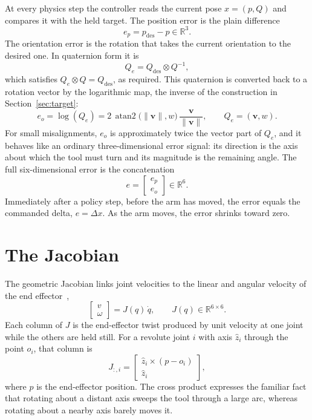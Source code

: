 \documentclass{article}
\newcommand{\R}{\mathbb{R}}
\newcommand{\des}{\mathrm{des}}
\begin{document}
At every physics step the controller reads the current pose $x=(p,Q)$ and compares it with the held target. The position error is the plain difference
\begin{equation}
  e_p = p_\des - p \in\R^3.
\end{equation}
The orientation error is the rotation that takes the current orientation to the desired one. In quaternion form it is
\begin{equation}
  Q_e = Q_\des\otimes Q^{-1},
\end{equation}
which satisfies $Q_e\otimes Q = Q_\des$, as required. This quaternion is converted back to a rotation vector by the logarithmic map, the inverse of the construction in Section~\ref{sec:target}:
\begin{equation}
  e_o = \log(Q_e) = 2\,\operatorname{atan2}\!\big(\lVert\mathbf v\rVert, w\big)\,\frac{\mathbf v}{\lVert\mathbf v\rVert}, \qquad Q_e=(\mathbf v,w).
\end{equation}
For small misalignments, $e_o$ is approximately twice the vector part of $Q_e$, and it behaves like an ordinary three-dimensional error signal: its direction is the axis about which the tool must turn and its magnitude is the remaining angle. The full six-dimensional error is the concatenation
\begin{equation}
  e = \begin{bmatrix} e_p\\ e_o\end{bmatrix}\in\R^6.
\end{equation}
Immediately after a policy step, before the arm has moved, the error equals the commanded delta, $e=\Delta x$. As the arm moves, the error shrinks toward zero.

\section{The Jacobian}
\label{sec:jacobian}

The geometric Jacobian links joint velocities to the linear and angular velocity of the end effector~\cite{siciliano2009robotics,lynch2017modern},
\begin{equation}
  \begin{bmatrix} v\\ \omega\end{bmatrix} = J(q)\,\dot q, \qquad J(q)\in\R^{6\times6}.
\end{equation}
Each column of $J$ is the end-effector twist produced by unit velocity at one joint while the others are held still. For a revolute joint $i$ with axis $\hat z_i$ through the point $o_i$, that column is
\begin{equation}
  J_{:,i} = \begin{bmatrix} \hat z_i\times(p-o_i)\\ \hat z_i\end{bmatrix},
\end{equation}
where $p$ is the end-effector position. The cross product expresses the familiar fact that rotating about a distant axis sweeps the tool through a large arc, whereas rotating about a nearby axis barely moves it.
\end{document}
